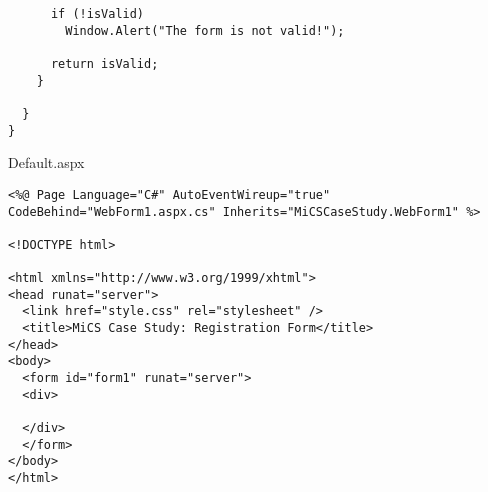 \begin{appendices}
\begin{lstlisting}
      if (!isValid)                
        Window.Alert("The form is not valid!");

      return isValid;
    }

  }
}

\end{lstlisting}

\newpage
Default.aspx

\begin{lstlisting}[language=HTML5]
<%@ Page Language="C#" AutoEventWireup="true" CodeBehind="WebForm1.aspx.cs" Inherits="MiCSCaseStudy.WebForm1" %>

<!DOCTYPE html>

<html xmlns="http://www.w3.org/1999/xhtml">
<head runat="server">
  <link href="style.css" rel="stylesheet" />
  <title>MiCS Case Study: Registration Form</title>
</head>
<body>
  <form id="form1" runat="server">
  <div>
  
  </div>
  </form>
</body>
</html>
\end{lstlisting}

\end{appendices}